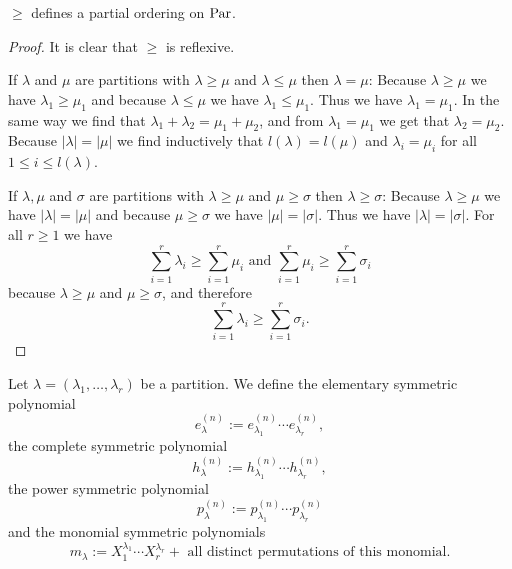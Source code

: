 \begin{lem}
 $\geq$ defines a partial ordering on $\operatorname{Par}$.
\end{lem}
\begin{proof}
 It is clear that $\geq$ is reflexive.
 
 If $\lambda$ and $\mu$ are partitions with $\lambda \geq \mu$ and $\lambda \leq \mu$ then $\lambda = \mu$: Because $\lambda \geq \mu$ we have $\lambda_1 \geq \mu_1$ and because $\lambda \leq \mu$ we have $\lambda_1 \leq \mu_1$. Thus we have $\lambda_1 = \mu_1$. In the same way we find that $\lambda_1 + \lambda_2 = \mu_1 + \mu_2$, and from $\lambda_1 = \mu_1$ we get that $\lambda_2 = \mu_2$. Because $|\lambda| = |\mu|$ we find inductively that $l(\lambda) = l(\mu)$ and $\lambda_i = \mu_i$ for all $1 \leq i \leq l(\lambda)$.
 
 If $\lambda, \mu$ and $\sigma$ are partitions with $\lambda \geq \mu$ and $\mu \geq \sigma$ then $\lambda \geq \sigma$: Because $\lambda \geq \mu$ we have $|\lambda| = |\mu|$ and because $\mu \geq \sigma$ we have $|\mu| = |\sigma|$. Thus we have $|\lambda| = |\sigma|$. For all $r \geq 1$ we have
 \[
  \sum_{i=1}^r \lambda_i \geq \sum_{i=1}^r \mu_i
  \text{ and }
  \sum_{i=1}^r \mu_i \geq \sum_{i=1}^r \sigma_i
 \]
 because $\lambda \geq \mu$ and $\mu \geq \sigma$, and therefore
 \[
  \sum_{i=1}^r \lambda_i \geq \sum_{i=1}^r \sigma_i.
 \]
\end{proof}


\begin{defi}
 Let $\lambda = (\lambda_1, \dotsc, \lambda_r)$ be a partition. We define the elementary symmetric polynomial
 \[
  e^{(n)}_\lambda := e^{(n)}_{\lambda_1} \dotsm e^{(n)}_{\lambda_r},
 \]
 the complete symmetric polynomial
 \[
  h^{(n)}_\lambda := h^{(n)}_{\lambda_1} \dotsm h^{(n)}_{\lambda_r},
 \]
 the power symmetric polynomial
 \[
  p^{(n)}_\lambda := p^{(n)}_{\lambda_1} \dotsm p^{(n)}_{\lambda_r}
 \]
 and the monomial symmetric polynomials
 \[
  m_\lambda := X_1^{\lambda_1} \dotsm X_r^{\lambda_r} + \text{ all distinct permutations of this monomial}.
 \]
\end{defi}


